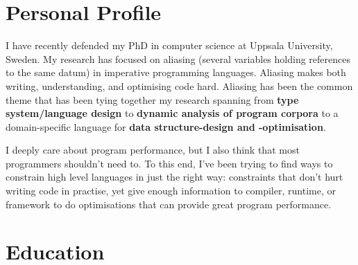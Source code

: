 \documentclass[10pt]{article} %
\begin{document}
\section{Personal Profile}

{I have recently defended my PhD in computer science at Uppsala University,
  Sweden. My research has focused on aliasing (several variables holding
  references to the same datum) in imperative programming languages. Aliasing
  makes both writing, understanding, and optimising code hard. Aliasing has been
  the common theme that has been tying together my research spanning from
  \textbf{type system/language design} to \textbf{dynamic analysis of program
    corpora} to a domain-specific language for \textbf{data structure-design and
    -optimisation}.

  I deeply care about program performance, but I also think that most
  programmers shouldn't need to. To this end, I've been trying to find ways to
  constrain high level languages in just the right way: constraints that don't
  hurt writing code in practise, yet give enough information to compiler,
  runtime, or framework to do optimisations that can provide great program
  performance.}


\newcommand{\project}[1]{\emph{#1}}
\newcommand{\ddomains}{\project{Disjointness Domains}}
\newcommand{\spencer}{\project{Spencer}}
\newcommand{\cflat}{\project{$C\flat$}}
\newcommand{\encore}{\project{Encore}}

\section{Education}
\end{document}
